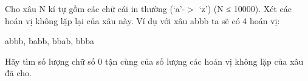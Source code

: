 Cho xâu N kí tự gồm các chữ cái in thường (‘a’-$>$ ‘z’) (N   ≤ 10000). Xét các hoán vị không lặp lại của xâu này. Ví   dụ với xâu abbb ta sẽ có 4 hoán vị:  

   abbb, babb, bbab, bbba  

   Hãy tìm số lượng chữ số 0 tận cùng của số lượng các   hoán vị không lặp của xâu đã cho.